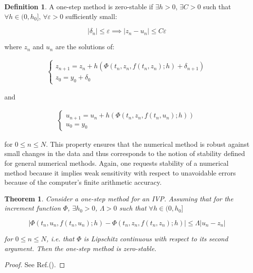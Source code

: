 \documentclass[11pt]{article}
\theoremstyle{theorem}
\newtheorem{theorem}{Theorem}
\theoremstyle{definition}
\newtheorem{definition}{Definition}
\begin{document}
\begin{definition}
	\label{def:zero-stability-one-step}
	A one-step method is zero-stable if $\exists h>0$, $\exists C>0$ such that $\forall h\in (0, h_0]$, $\forall\varepsilon>0$ sufficiently small:
	
	$$|\delta_n|\le\varepsilon\implies |z_n-u_n|\le C\varepsilon$$
	
	where $z_n$ and $u_n$ are the solutions of:
	
	\begin{align*}
	\begin{cases}
	z_{n+1}=z_n+h\left(\Phi(t_n, z_n, f(t_n, z_n);h)+\delta_{n+1}\right)\\
	z_0=y_0+\delta_0
	\end{cases}
	\end{align*}
	
	and 
	
	\begin{align*}
	\begin{cases}
	u_{n+1}=u_n+h\left(\Phi(t_n, z_n, f(t_n, u_n);h)\right)\\
	u_0=y_0
	\end{cases}
	\end{align*}
	
	for $0\le n\le N$.
	This property ensures that the numerical method is robust against small changes in
	the data and thus corresponds to the notion of stability defined for general numerical methods. Again, one requests stability of a numerical method because it implies weak sensitivity with respect to unavoidable errors because of the computer’s finite arithmetic accuracy.
\end{definition}

\begin{theorem}
	\label{thm:zero-stability}
	Consider a one-step method for an IVP. Assuming that for the increment function $\Phi$, $\exists h_0>0$, $\Lambda>0$ such that $\forall h\in(0, h_0]$
	
	
	$$|\Phi(t_n, u_n, f(t_n, u_n);h)-\Phi(t_n, z_n,f(t_n, z_n);h)|\le\Lambda|u_n-z_n|$$
	
	for $0\le n\le N$, i.e. that $\Phi$ is Lipschitz continuous with respect to its second argument. Then the one-step method is zero-stable.\\
\end{theorem}

\begin{proof}
	See Ref.(\cite{lec-notes}).
\end{proof}
\end{document}
